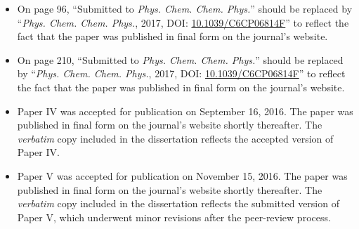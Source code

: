 \begin{itemize}
\item On page 96, \enquote{Submitted to \textit{Phys. Chem. Chem. Phys.}}
should be replaced by \enquote{\textit{Phys. Chem. Chem. Phys.}, 2017, DOI:
\url{10.1039/C6CP06814F}} to reflect the fact that the paper was published in
final form on the journal's website.
\item On page 210, \enquote{Submitted to \textit{Phys. Chem. Chem. Phys.}}
should be replaced by \enquote{\textit{Phys. Chem. Chem. Phys.}, 2017, DOI:
\url{10.1039/C6CP06814F}} to reflect the fact that the paper was published in
final form on the journal's website.
\item Paper IV was accepted for publication on September 16, 2016. The paper
was published in final form on the journal's website shortly thereafter. The
\emph{verbatim} copy included in the dissertation reflects the accepted version
of Paper IV.
\item Paper V was accepted for publication on November 15, 2016. The paper was
published in final form on the journal's website shortly thereafter. The
\emph{verbatim} copy included in the dissertation reflects the submitted
version of Paper V, which underwent minor revisions after the peer-review
process.
\end{itemize}
